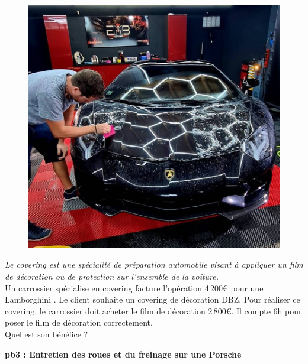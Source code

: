 \begin{multicols}{2} 

\begin{figure}[H]
  \centering
  \includegraphics[width=0.6\linewidth]{5x2-inegalite-triangulaire/lambo.jpg}
\end{figure} \columnbreak

\textit{Le covering est une spécialité de préparation automobile visant à appliquer un film de décoration ou de protection sur l'ensemble de la voiture.} \\

Un carrossier spécialise en covering facture l'opération 4\,200€ pour une Lamborghini . Le client souhaite un covering de décoration DBZ.
Pour réaliser ce covering, le carrossier doit acheter le film de décoration 2\,800€. Il compte 6h pour poser le film de décoration correctement. \\

Quel est son bénéfice ? 

\end{multicols}

\newpage

\textbf{pb3 : Entretien des roues et du freinage sur une Porsche} \\

